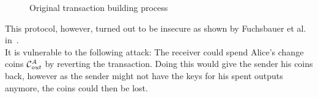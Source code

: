 \begin{figure}
    \centering
    \caption{Original transaction building process\label{fig:txOriginal}}
\end{figure}

This protocol, however, turned out to be insecure as shown by Fuchsbauer et al. in~\cite{fuchsbauer2019aggregate}. \\
It is vulnerable to the following attack:
The receiver could spend Alice's change coins $\mathcal{C}_{\mathit{out}}^A$ by reverting the transaction.
Doing this would give the sender his coins back, however as the sender might not have the keys for his spent outputs anymore, the coins could then be lost.

